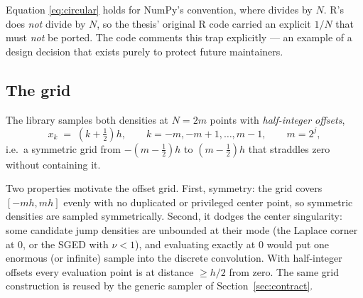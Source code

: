 \begin{remark}
\label{rem:ifft}
Equation \eqref{eq:circular} holds for NumPy's convention, where
 divides by $N$. R's 
does \emph{not} divide by $N$, so the thesis' original R code carried an
explicit $1/N$ that must \emph{not} be ported. The code comments this
trap explicitly --- an example of a design decision that exists purely to
protect future maintainers.
\end{remark}

\subsection{The grid}
\label{sec:fft-grid}

The library samples both densities at $N = 2m$ points with
\emph{half-integer offsets},
\begin{equation}
  x_k \;=\; \left(k + \tfrac12\right) h,
  \qquad
  k = -m, -m+1, \dots, m-1,
  \qquad
  m = 2^{j},
  \label{eq:grid}
\end{equation}
i.e.\ a symmetric grid from $-(m - \tfrac12)h$ to $(m - \tfrac12)h$ that
straddles zero without containing it.

\begin{decision}
\label{dec:half-integer}
Two properties motivate the offset grid. First, symmetry: the grid covers
$[-mh, mh]$ evenly with no duplicated or privileged center point, so
symmetric densities are sampled symmetrically. Second, it dodges the
center singularity: some candidate jump densities are unbounded at their
mode (the Laplace corner at $0$, or the SGED with $\nu < 1$), and
evaluating exactly at $0$ would put one enormous (or infinite) sample into
the discrete convolution. With half-integer offsets every evaluation point
is at distance $\ge h/2$ from zero. The same grid construction is reused
by the generic sampler of Section~\ref{sec:contract}.
\end{decision}

